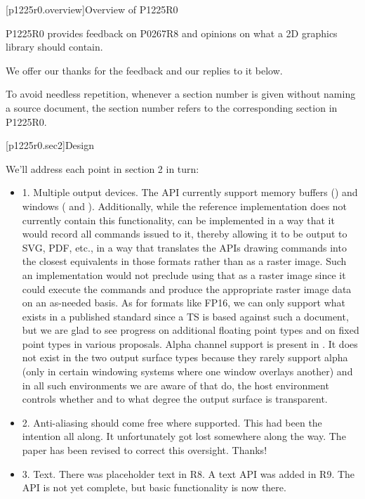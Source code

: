 
[p1225r0.overview]{Overview of P1225R0}

\pnum
P1225R0 provides feedback on P0267R8 and opinions on what a 2D graphics library should contain.

\pnum
We offer our thanks for the feedback and our replies to it below.

\pnum
To avoid needless repetition, whenever a section number is given without naming a source document, the section number refers to the corresponding section in P1225R0. 

[p1225r0.sec2]{Design}

\pnum
We'll address each point in section 2 in turn:
\begin{itemize}
\item 1. Multiple output devices. The API currently support memory buffers () and windows ( and ). Additionally, while the reference implementation does not currently contain this functionality,  can be implemented in a way that it would record all commands issued to it, thereby allowing it to be output to SVG, PDF, etc., in a way that translates the APIs drawing commands into the closest equivalents in those formats rather than as a raster image. Such an implementation would not preclude using that  as a raster image since it could execute the commands and produce the appropriate raster image data on an as-needed basis. As for formats like FP16, we can only support what exists in a published standard since a TS is based against such a document, but we are glad to see progress on additional floating point types and on fixed point types in various proposals. Alpha channel support is present in . It does not exist in the two output surface types because they rarely support alpha (only in certain windowing systems where one window overlays another) and in all such environments we are aware of that do, the host environment controls whether and to what degree the output surface is transparent.
\item 2. Anti-aliasing should come free where supported. This had been the intention all along. It unfortunately got lost somewhere along the way. The paper has been revised to correct this oversight. Thanks!
\item 3. Text. There was placeholder text in R8. A text API was added in R9. The API is not yet complete, but basic functionality is now there.

\end{itemize}

